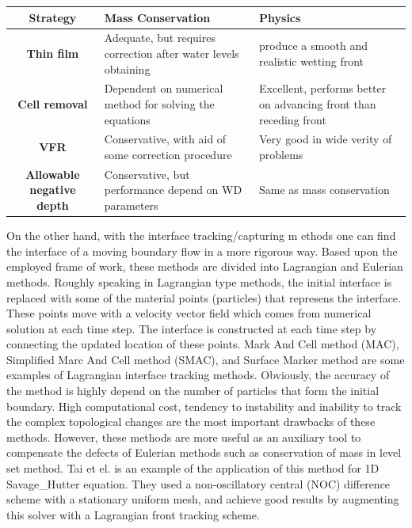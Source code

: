 \documentclass[letterpaper,10pt]{article}
\begin{document}
\begin{center}\label{table1}
\begin{tabular}{|c|p{5cm}|p{5cm}|}
 
\hline
{\bf Strategy}                  & {\bf Mass Conservation}                                          & {\bf Physics} \\
\hline
{\bf Thin film}                 & Adequate, but requires correction after water levels obtaining   & produce a smooth and realistic wetting front      \\
\hline 
{\bf Cell removal}              & Dependent on numerical method for solving the equations          & Excellent, performs better on advancing front than receding front \\
\hline
{\bf VFR}                       & Conservative, with aid of some correction procedure              & Very good in wide verity of problems      \\
\hline
{\bf Allowable negative depth}  & Conservative, but performance depend on WD parameters            & Same as mass conservation      \\
\hline
\end{tabular}
\end{center}

On the other hand, with the interface tracking/capturing m ethods one can find the interface
of a moving boundary flow in a more rigorous way.
Based upon the employed frame of work, these methods are divided into Lagrangian and Eulerian methods.
Roughly speaking in Lagrangian type methods, the initial interface is replaced with some of the material 
points (particles) that represens the interface. These points move with a velocity vector field which comes 
from numerical solution at each time step. The interface is constructed at each time step by connecting 
the updated location of these points. 
Mark And Cell method (MAC)\cite{}, Simplified Marc And Cell method (SMAC),
and Surface Marker method are some examples of Lagrangian interface tracking methods.
Obviously, the accuracy of the method is highly depend on the number 
of particles that form the initial boundary. 
High computational cost, tendency to instability and inability to track the complex topological changes are the most 
important drawbacks of these methods. 
However, these methods are more useful as an auxiliary tool to compensate the defects of Eulerian methods 
such as conservation of mass in level set method. Tai et el. \cite{Tai2002} is an example of the application of 
this method for 1D Savage\_Hutter equation. They used a non-oscillatory central (NOC) difference scheme with a 
stationary uniform mesh, and achieve good results by augmenting this solver with a Lagrangian front tracking scheme.\newline
\end{document}
